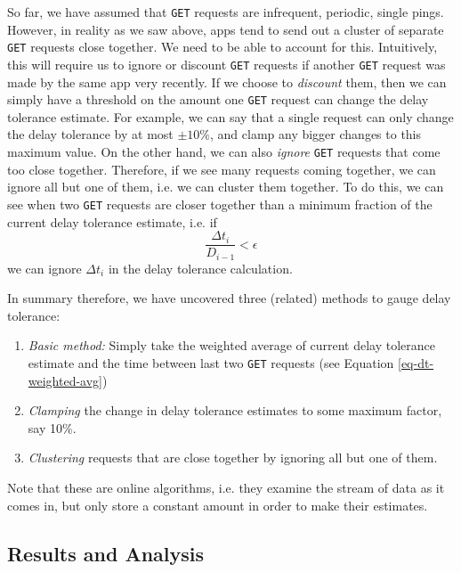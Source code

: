 \documentclass[12pt, fleqn]{article}
\begin{document}
So far, we have assumed that \texttt{GET} requests are infrequent, periodic, single pings. 
However, in reality as we saw above, apps tend to send out a cluster of separate \texttt{GET} 
requests close together. We need to be able to account for this. Intuitively, this will 
require us to ignore or discount \texttt{GET} requests if another \texttt{GET} request was 
made by the same app very recently. If we choose to \emph{discount} them, then we can simply 
have a threshold on the amount one \texttt{GET} request can change the delay tolerance estimate. 
For example, we can say that a single request can only change the delay tolerance 
by at most $\pm 10\%$, and clamp any bigger changes to this maximum value. On 
the other hand, we can also \emph{ignore} \texttt{GET} requests that come too 
close together. Therefore, if we see many requests coming together, we can 
ignore all but one of them, i.e. we can cluster them together. To do this, we 
can see when two \texttt{GET} requests are closer together than a minimum 
fraction of the current delay tolerance estimate, i.e. if
\begin{equation} \label{eq-dt-clustering}
  \frac{\Delta t_i}{D_{i-1}} < \epsilon
\end{equation}
we can ignore $\Delta t_i$ in the delay tolerance calculation.

In summary therefore, we have uncovered three (related) methods to gauge delay tolerance:
\begin{enumerate}
  \item \emph{Basic method:} Simply take the weighted average of current delay 
  tolerance estimate and the time between last two \texttt{GET} requests (see Equation \ref{eq-dt-weighted-avg})
  \item \emph{Clamping} the change in delay tolerance estimates to some maximum 
  factor, say 10\%. 
  \item \emph{Clustering} requests that are close together by ignoring all but one of them. 
\end{enumerate}

Note that these are online algorithms, i.e. they examine the stream of 
data as it comes in, but only store a constant amount in order to make their 
estimates.

\subsection{Results and Analysis}
\end{document}
